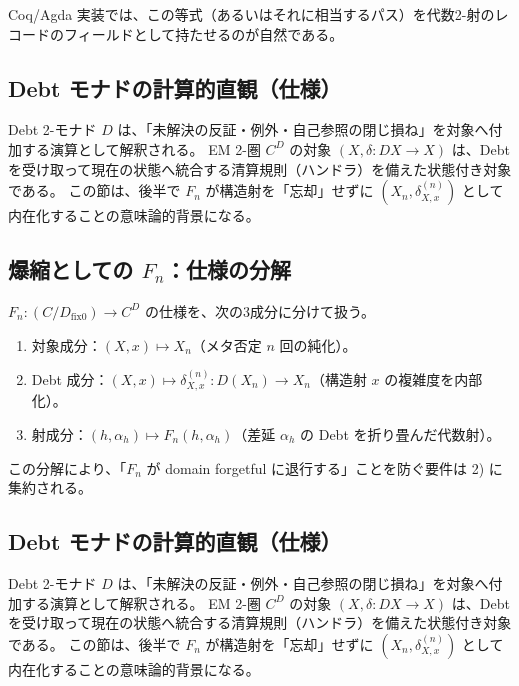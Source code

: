 \documentclass[a4paper,11pt]{article}
\begin{document}
\begin{remark}
Coq/Agda 実装では、この等式（あるいはそれに相当するパス）を代数2-射のレコードのフィールドとして持たせるのが自然である。
\end{remark}

\subsection{Debt モナドの計算的直観（仕様）}
\begin{remark}
Debt 2-モナド $D$ は、「未解決の反証・例外・自己参照の閉じ損ね」を対象へ付加する演算として解釈される。
EM 2-圏 $C^D$ の対象 $(X,\delta:DX\to X)$ は、Debt を受け取って現在の状態へ統合する清算規則（ハンドラ）を備えた状態付き対象である。
この節は、後半で $F_n$ が構造射を「忘却」せずに $(X_n,\delta_{X,x}^{(n)})$ として内在化することの意味論的背景になる。
\end{remark}

\subsection{爆縮としての \texorpdfstring{$F_n$}{Fn}：仕様の分解}
\begin{definition}
$F_n:(C/D_{\mathrm{fix}0})\to C^D$ の仕様を、次の3成分に分けて扱う。
\begin{enumerate}
  \item 対象成分：$(X,x)\mapsto X_n$（メタ否定 $n$ 回の純化）。
  \item Debt 成分：$(X,x)\mapsto \delta_{X,x}^{(n)}:D(X_n)\to X_n$（構造射 $x$ の複雑度を内部化）。
  \item 射成分：$(h,\alpha_h)\mapsto F_n(h,\alpha_h)$（差延 $\alpha_h$ の Debt を折り畳んだ代数射）。
\end{enumerate}
\end{definition}

\begin{remark}
この分解により、「$F_n$ が domain forgetful に退行する」ことを防ぐ要件は 2) に集約される。
\end{remark}

\subsection{Debt モナドの計算的直観（仕様）}
\begin{remark}
Debt 2-モナド $D$ は、「未解決の反証・例外・自己参照の閉じ損ね」を対象へ付加する演算として解釈される。
EM 2-圏 $C^D$ の対象 $(X,\delta:DX\to X)$ は、Debt を受け取って現在の状態へ統合する清算規則（ハンドラ）を備えた状態付き対象である。
この節は、後半で $F_n$ が構造射を「忘却」せずに $(X_n,\delta_{X,x}^{(n)})$ として内在化することの意味論的背景になる。
\end{remark}
\end{document}
